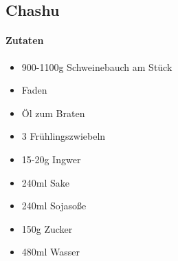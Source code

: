 \newpage
\subsection{Chashu}
\paragraph{Zutaten}
\begin{itemize}[noitemsep]
	\item 900-1100g Schweinebauch am Stück 
	\item Faden
	\item Öl zum Braten
	\item 3 Frühlingszwiebeln
	\item 15-20g Ingwer
	\item 240ml Sake
	\item 240ml Sojasoße 
	\item 150g Zucker 
	\item 480ml Wasser 
\end{itemize}
